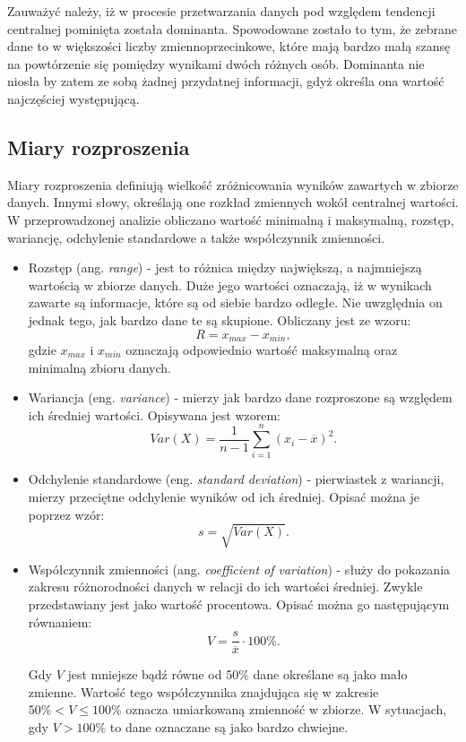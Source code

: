 \documentclass[a4paper,12pt,numbers=noenddot]{report}
\begin{document}
Zauważyć należy, iż w procesie przetwarzania danych pod względem tendencji centralnej pominięta została dominanta. Spowodowane zostało to tym, że zebrane dane to w większości liczby zmiennoprzecinkowe, które mają bardzo małą szansę na powtórzenie się pomiędzy wynikami dwóch różnych osób. Dominanta nie niosła by zatem ze sobą żadnej przydatnej informacji, gdyż określa ona wartość najczęściej występującą.

\subsection{Miary rozproszenia}
Miary rozproszenia definiują wielkość zróżnicowania wyników zawartych w zbiorze danych. Innymi słowy, określają one rozkład zmiennych wokół centralnej wartości. W przeprowadzonej analizie obliczano wartość minimalną i maksymalną, rozstęp, wariancję, odchylenie standardowe a także współczynnik zmienności.
\begin{itemize}
\item
Rozstęp (ang. \textit{range}) - jest to różnica między największą, a najmniejszą wartością w zbiorze danych. Duże jego wartości oznaczają, iż w wynikach zawarte są informacje, które są od siebie bardzo odległe. Nie uwzględnia on jednak tego, jak bardzo dane te są skupione. Obliczany jest ze wzoru:
\begin{equation}
\label{eq_range}
R = x_{max} - x_{min},
\end{equation}
gdzie $x_{max}$ i $x_{min}$ oznaczają odpowiednio wartość maksymalną oraz minimalną zbioru danych.

\item
Wariancja (eng. \textit{variance}) - mierzy jak bardzo dane rozproszone są względem ich średniej wartości. Opisywana jest wzorem:
\begin{equation}
\label{eq_variance}
Var(X) = \frac{1}{n-1}\sum_{i=1}^{n}{(x_{i}-\overline{x})}^2.
\end{equation}
\item
Odchylenie standardowe (eng. \textit{standard deviation}) - pierwiastek z wariancji, mierzy przeciętne odchylenie wyników od ich średniej. Opisać można je poprzez wzór:
\begin{equation}
\label{eq_stddev}
s = \sqrt{Var(X)}.
\end{equation}

\item
Współczynnik zmienności (ang. \textit{coefficient of variation}) - służy do pokazania zakresu różnorodności danych w relacji do ich wartości średniej. Zwykle przedstawiany jest jako wartość procentowa. Opisać można go następującym równaniem:
\begin{equation}
\label{eq_stddev}
V = \frac{s}{\overline{x}}\cdot 100\%.
\end{equation}

Gdy $V$ jest mniejsze bądź równe od 50\% dane określane są jako mało zmienne. Wartość tego współczynnika znajdująca się w zakresie $50\% < V \leq 100\%$ oznacza umiarkowaną zmienność w zbiorze. W sytuacjach, gdy $V > 100\%$ to dane oznaczane są jako bardzo chwiejne.

\end{itemize}
\end{document}
